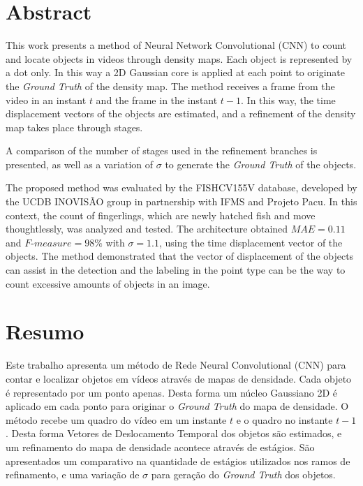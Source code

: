 \chapter*{Abstract}

This work presents a method of Neural Network Convolutional (CNN) to count and locate objects in videos through density maps.
Each object is represented by a dot only. In this way a 2D Gaussian core is applied at each point to originate the \textit{Ground Truth} of the density map.
The method receives a frame from the video in an instant $t$ and the frame in the instant $ t-1 $. In this way, the time displacement vectors of the objects are estimated, and a refinement of the density map takes place through stages.

A comparison of the number of stages used in the refinement branches is presented, as well as a variation of $\sigma$ to generate the \textit{Ground Truth} of the objects.

The proposed method was evaluated by the FISHCV155V database, developed by the UCDB INOVISÃO group in partnership with IFMS and Projeto Pacu. In this context, the count of fingerlings, which are newly hatched fish and move thoughtlessly, was analyzed and tested. The architecture obtained $MAE = 0.11$ and $\textit{F-measure} = 98\%$ with $\sigma = 1.1$, using the time displacement vector of the objects. The method demonstrated that the vector of displacement of the objects can assist in the detection and the labeling in the point type can be the way to count excessive amounts of objects in an image.



\chapter*{Resumo}

Este trabalho apresenta um método de Rede Neural Convolutional (CNN) para contar e localizar objetos em vídeos através de mapas de densidade. 
Cada objeto é representado por um ponto apenas. Desta forma um núcleo Gaussiano 2D é aplicado em cada ponto para originar o \textit{Ground Truth} do mapa de densidade.
O método recebe um quadro do vídeo em um instante $t$ e o quadro no instante $t-1$. Desta forma Vetores de Deslocamento Temporal dos objetos são estimados, e um refinamento do mapa de densidade acontece através de estágios. 
São apresentados um comparativo na quantidade de estágios utilizados nos ramos de refinamento, e uma  variação de $\sigma$ para geração do \textit{Ground Truth} dos objetos.

